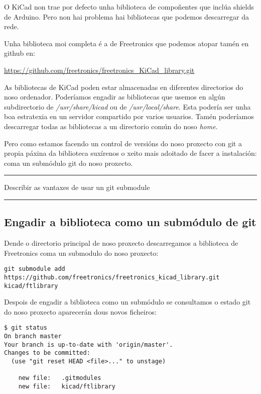 O KiCad non trae por defecto unha biblioteca de compoñentes que inclúa
shields de Arduino. Pero non hai problema hai bibliotecas que podemos
descarregar da rede.

Unha biblioteca moi completa é a de Freetronics que podemos atopar tamén
en github en:

\url{https://github.com/freetronics/freetronics_KiCad_library.git}

As bibliotecas de KiCad poden estar almacenadas en diferentes
directorios do noso ordenador. Poderíamos engadir as bibliotecas que
usemos en algún subdirectorio de \emph{/usr/share/kicad} ou de
\emph{/usr/local/share}. Esta podería ser unha boa estratexia en un
servidor compartido por varios usuarios. Tamén poderíamos descarregar
todas as bibliotecas a un directorio común do noso \emph{home}.

Pero como estamos facendo un control de versións do noso proxecto con
git a propia páxina da biblioteca suxírenos o xeito mais adoitado de
facer a instalación: coma un submódulo git do noso proxecto.

\begin{center}\rule{0.5\linewidth}{\linethickness}\end{center}

Describir as vantaxes de usar un git submodule

\begin{center}\rule{0.5\linewidth}{\linethickness}\end{center}

\subsection{Engadir a biblioteca como un submódulo de
git}\label{engadir-a-biblioteca-como-un-submuxf3dulo-de-git}

Dende o directorio principal de noso proxecto descarregamos a biblioteca
de Freetronics coma un submodulo do noso proxecto:

\begin{verbatim}
git submodule add https://github.com/freetronics/freetronics_kicad_library.git kicad/ftlibrary
\end{verbatim}

Despois de engadir a biblioteca como un submódulo se consultamos o
estado git do noso proxecto aparecerán dous novos ficheiros:

\begin{verbatim}
$ git status
On branch master
Your branch is up-to-date with 'origin/master'.
Changes to be committed:
  (use "git reset HEAD <file>..." to unstage)

    new file:   .gitmodules
    new file:   kicad/ftlibrary
\end{verbatim}

